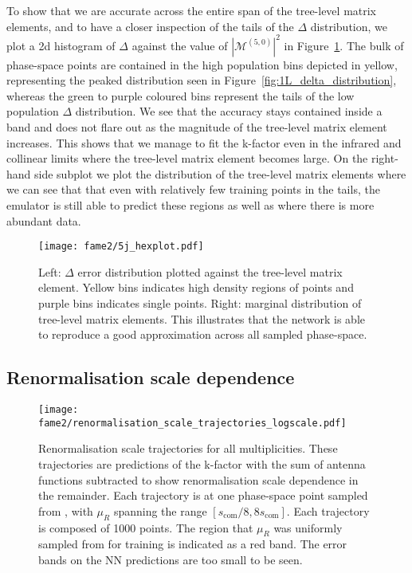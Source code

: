\documentclass[main.tex]{subfiles}
\begin{document}
To show that we are accurate across the entire span of the tree-level
matrix elements, and to have a closer inspection of the tails
of the $\Delta$ distribution, we plot a 2d histogram of $\Delta$
against the value of $|\mathcal{M}^{(5, 0)}|^{2}$ in
Figure~\ref{fig:1L_delta_hexplot}. The bulk of phase-space points
are contained in the high population bins depicted in yellow,
representing the peaked distribution seen in Figure~\ref{fig:1L_delta_distribution},
whereas the green to purple coloured bins represent the tails of the
low population $\Delta$ distribution. We see that the accuracy
stays contained inside a band and does not flare out
as the magnitude of the tree-level matrix element increases.
This shows that we manage to fit the k-factor even in
the infrared and collinear limits where the tree-level
matrix element becomes large. On the right-hand side subplot we plot
the distribution of the tree-level matrix elements where
we can see that that even with relatively few training
points in the tails, the emulator is still able to predict
these regions as well as where there is more abundant data.
\begin{figure}
    \centering
    \texttt{[image: fame2/5j\_hexplot.pdf]}
    \caption{Left: $\Delta$ error distribution plotted against the
    tree-level matrix element. Yellow bins indicates high density regions
    of points and purple bins indicates single points.
    Right: marginal distribution of tree-level matrix elements.
    This illustrates that the network is able to reproduce
    a good approximation across all sampled phase-space.}
    \label{fig:1L_delta_hexplot}
\end{figure}

\subsection{Renormalisation scale dependence}
\begin{figure}
    \centering
    \texttt{[image: fame2/renormalisation\_scale\_trajectories\_logscale.pdf]}
    \caption{Renormalisation scale trajectories for all multiplicities.
    These trajectories are predictions of the k-factor with the sum
    of antenna functions subtracted to show renormalisation scale
    dependence in the remainder. Each trajectory is at one phase-space point
    sampled from {\RAMBO}, with $\mu_{R}$ spanning the range
    $[s_{\mathrm{com}}/8, 8 s_{\mathrm{com}}]$. Each trajectory
    is composed of 1000 points.
    The region that $\mu_{R}$ was uniformly sampled from
    for training is indicated as a red band. The error bands on the NN
    predictions are too small to be seen.}
    \label{fig:1L_mu_trajectory}
\end{figure}
\end{document}
